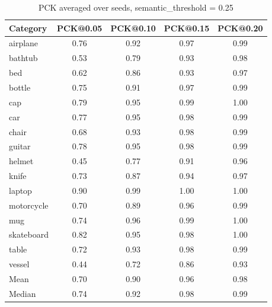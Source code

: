 \begin{table}[h]
\centering
\caption{PCK averaged over seeds, semantic\_threshold = 	0.25}
\label{tab:pck_thresh_1_5}
\begin{tabular}{lcccc}
\toprule
Category & PCK@0.05 & PCK@0.10 & PCK@0.15 & PCK@0.20 \\
\midrule
airplane & 0.76 & 0.92 & 0.97 & 0.99 \\
bathtub & 0.53 & 0.79 & 0.93 & 0.98 \\
bed & 0.62 & 0.86 & 0.93 & 0.97 \\
bottle & 0.75 & 0.91 & 0.97 & 0.99 \\
cap & 0.79 & 0.95 & 0.99 & 1.00 \\
car & 0.77 & 0.95 & 0.98 & 0.99 \\
chair & 0.68 & 0.93 & 0.98 & 0.99 \\
guitar & 0.78 & 0.95 & 0.98 & 0.99 \\
helmet & 0.45 & 0.77 & 0.91 & 0.96 \\
knife & 0.73 & 0.87 & 0.94 & 0.97 \\
laptop & 0.90 & 0.99 & 1.00 & 1.00 \\
motorcycle & 0.70 & 0.89 & 0.96 & 0.99 \\
mug & 0.74 & 0.96 & 0.99 & 1.00 \\
skateboard & 0.82 & 0.95 & 0.98 & 1.00 \\
table & 0.72 & 0.93 & 0.98 & 0.99 \\
vessel & 0.44 & 0.72 & 0.86 & 0.93 \\
\midrule
Mean & 0.70 & 0.90 & 0.96 & 0.98 \\
Median & 0.74 & 0.92 & 0.98 & 0.99 \\
\bottomrule
\end{tabular}
\end{table}